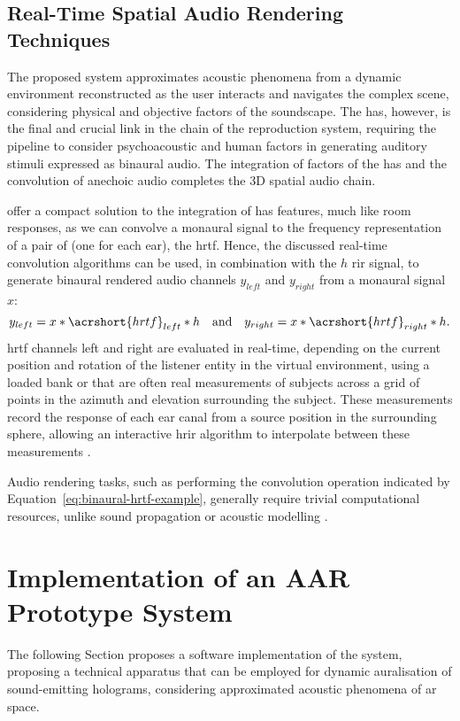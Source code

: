 \subsection{Real-Time Spatial Audio Rendering Techniques}
The proposed system approximates acoustic phenomena from a dynamic environment reconstructed as the user interacts and navigates the complex scene, considering physical and objective factors of the soundscape. The \acrshort{has}, however, is the final and crucial link in the chain of the reproduction system, requiring the pipeline to consider psychoacoustic and human factors in generating auditory stimuli expressed as binaural audio. The integration of factors of the \acrshort{has} and the convolution of anechoic audio completes the 3D spatial audio chain.\par
{} offer a compact solution to the integration of \acrshort{has} features, much like room responses, as we can convolve a monaural signal to the frequency representation of a pair of  (one for each ear), the \acrfull{hrtf}. Hence, the discussed real-time convolution algorithms \citep{kim2019immersive} can be used, in combination with the $h$ \acrshort{rir} signal, to generate binaural rendered audio channels $y_{left}$ and $y_{right}$ from a monaural signal $x$:
\begin{equation}\label{eq:binaural-hrtf-example}
    y_{left} = x * \acrshort{hrtf}_{left} * h \quad \textrm{and} \quad  y_{right} = x * \acrshort{hrtf}_{right} * h \textrm{.}
\end{equation}
\acrshort{hrtf} channels left and right are evaluated in real-time, depending on the current position and rotation of the listener entity in the virtual environment, using a loaded bank or  that are often real measurements of subjects across a grid of points in the azimuth and elevation surrounding the subject. These measurements record the response of each ear canal from a source position in the surrounding sphere, allowing an interactive \acrshort{hrir} algorithm to interpolate between these measurements \citep{hoene2017mysofa}.\par
Audio rendering tasks, such as performing the convolution operation indicated by Equation~\ref{eq:binaural-hrtf-example}, generally require trivial computational resources, unlike sound propagation or acoustic modelling \citep{liu2020sound}. 

\section{Implementation of an AAR Prototype System}
The following Section proposes a software implementation of the system, proposing a technical apparatus that can be employed for dynamic auralisation of sound-emitting holograms, considering approximated acoustic phenomena of \acrshort{ar} space.


